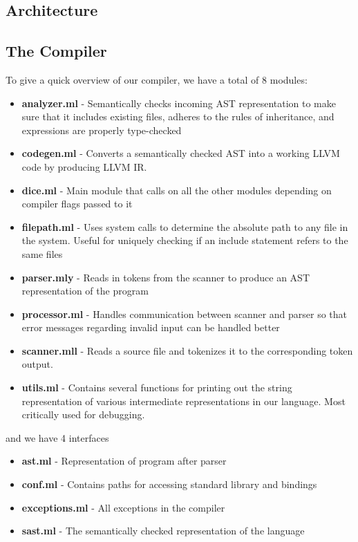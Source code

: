 \begin{homeworkProblem}
	\chapter{Architecture}
	\section{The Compiler}
	To give a quick overview of our compiler, we have a total of 8 modules:
	\begin{itemize}
		\item \textbf{analyzer.ml} - Semantically checks incoming AST representation to make sure that it includes existing files, adheres to the rules of inheritance, and expressions are properly type-checked
		\item \textbf{codegen.ml} - Converts a semantically checked AST into a working LLVM code by producing LLVM IR. 
		\item \textbf{dice.ml} - Main module that calls on all the other modules depending on compiler flags passed to it
		\item \textbf{filepath.ml} - Uses system calls to determine the absolute path to any file in the system. Useful for uniquely checking if an include statement refers to the same files
		\item \textbf{parser.mly} - Reads in tokens from the scanner to produce an AST representation of the program
		\item \textbf{processor.ml} - Handles communication between scanner and parser so that error messages regarding invalid input can be handled better
		\item \textbf{scanner.mll} - Reads a source file and tokenizes it to the corresponding token output. 
		\item \textbf{utils.ml} - Contains several functions for printing out the string representation of various intermediate representations in our language. Most critically used for debugging. 
	\end{itemize}
	
	and we have 4 interfaces
	\begin{itemize}
		\item \textbf{ast.ml} - Representation of program after parser
		\item \textbf{conf.ml} - Contains paths for accessing standard library and bindings
		\item \textbf{exceptions.ml} - All exceptions in the compiler
		\item \textbf{sast.ml} - The semantically checked representation of the language
	\end{itemize}
	

\end{homeworkProblem}
